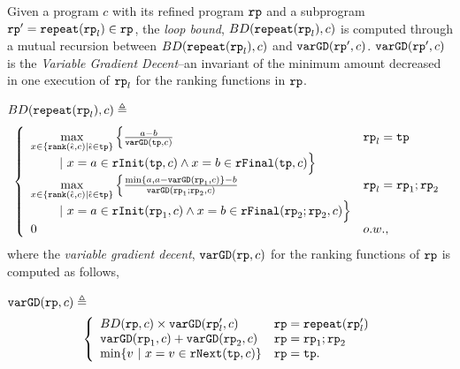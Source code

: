 \begin{defn}
\label{def:loopbound}
Given a program $c$ with its refined program $\mathtt{rp}$ and a subprogram $\mathtt{rp}' = \mathtt{repeat}(\mathtt{rp}_l) \in \mathtt{rp}$, the \emph{loop bound}, $BD(\mathtt{repeat}(\mathtt{rp}_l), c)$ is computed
through a mutual recursion between  $BD(\mathtt{repeat}(\mathtt{rp}_l), c)$ and $\mathtt{varGD}(\mathtt{rp}', c)$.
$\mathtt{varGD}(\mathtt{rp}', c)$ is the \emph{Variable Gradient Decent}--an invariant of the minimum amount decreased in one execution of $\mathtt{rp}_l$ for the ranking functions in $\mathtt{rp}$.

$BD(\mathtt{repeat}(\mathtt{rp}_l), c)\triangleq$
 \[
 \left\{ 
 \begin{array}{ll}
 \max\limits_{x \in \left\{ \rank(\absevent, c) | \absevent \in \tpath \right\}} 
 \Big\{ \highlight{\frac{a - b}{\varGD(\tpath, c)}} & \rprog_l = \tpath
 \\ \qquad 
 ~\vert~
 x = a \in \rfinit(\tpath, c)
 \land x = b \in \rffinal(\tpath, c)
 \Big\} 
 \\
 \max\limits_{x \in \left\{ \rank(\absevent, c) | \absevent \in \tpath \right\}} 
 \Big\{ \highlight{\frac{\min\{ a, a - \varGD(\rprog_1, c) \} - b}{\varGD(\rprog_1;\rprog_2, c)}} 
 & \rprog_l = \rprog_1;\rprog_2
 \\ \qquad 
 ~\vert~
 x = a \in \rfinit(\rprog_1, c)
 \land x = b \in \rffinal(\rprog_2;\rprog_2, c)
 \Big\} \\
 0 & o.w.,
 \end{array} 
 \right.
\]
where the \emph{variable gradient decent},
$\mathtt{varGD}(\mathtt{rp}, c)$ for the ranking functions of $\mathtt{rp}$ is computed as follows,

$ \mathtt{varGD}(\mathtt{rp}, c) \triangleq$
\[
 \left\{
 \begin{array}{ll}
 BD(\rprog, c) \times {\varGD(\rprog_l', c)} & \rprog = \rprepeat(\rprog_l') \\
 \varGD(\rprog_1, c) + \varGD(\rprog_2, c) & \rprog = \rprog_1;\rprog_2 \\
 \min\left\{v ~|~ x = v \in \rfnext(\tpath, c) \right\} & \rprog = \tpath.
 \end{array}
 \right.
 \]


\end{defn}
